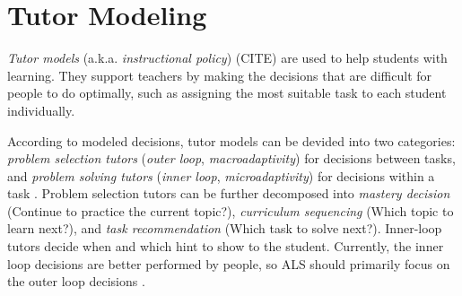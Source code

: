 
\section{Tutor Modeling}
\label{sec:tutor-modeling}

\emph{Tutor models} (a.k.a. \emph{instructional policy}) (CITE) %
are used to help students with learning.
They support teachers by making the decisions that are difficult for people
to do optimally, %
such as assigning the most suitable task to each student individually.

According to modeled decisions, tutor models can be devided into two categories:
\emph{problem selection tutors} (\emph{outer loop}, \emph{macroadaptivity})
for decisions between tasks, %
and \emph{problem solving tutors} (\emph{inner loop}, \emph{microadaptivity})
for decisions within a task \cite{its-learner-models}. %
Problem selection tutors can be further decomposed %
into
\emph{mastery decision} (Continue to practice the current topic?),
\emph{curriculum sequencing} (Which topic to learn next?),
and \emph{task recommendation} (Which task to solve next?).
Inner-loop tutors decide when and which hint to show to the
student. %
Currently, the inner loop decisions are better performed by people,
so ALS should primarily focus on the outer loop decisions \cite{als-future}.


